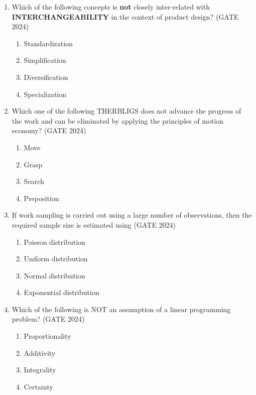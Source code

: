 \documentclass[journal,12pt,onecolumn]{IEEEtran}
\theoremstyle{remark}
\begin{document}
\begin{enumerate}
\item Which of the following concepts is \textbf{not} closely inter-related with \textbf{INTERCHANGEABILITY} in the context of product design?
\hfill{(GATE 2024)}
\begin{multicols}{4}
\begin{enumerate}
    \item Standardization
    \item Simplification
    \item Diversification
    \item Specialization
\end{enumerate}
\end{multicols}
\vspace{1cm}

\item Which one of the following THERBLIGS does not advance the progress of the work and can be eliminated by applying the principles of motion economy?
\hfill{(GATE 2024)}
\begin{multicols}{4}
\begin{enumerate}
    \item Move
    \item Grasp
    \item Search
    \item Preposition
\end{enumerate}
\end{multicols}
\vspace{1cm}

\item If work sampling is carried out using a large number of observations, then the required sample size is estimated using
\hfill{(GATE 2024)}
\begin{multicols}{4}
\begin{enumerate}
    \item Poisson distribution
    \item Uniform distribution
    \item Normal distribution
    \item Exponential distribution
\end{enumerate}
\end{multicols}
\vspace{1cm}

\item Which of the following is NOT an assumption of a linear programming problem?
\hfill{(GATE 2024)}
\begin{multicols}{4}
\begin{enumerate}
    \item Proportionality
    \item Additivity
    \item Integrality
    \item Certainty
\end{enumerate}
\end{multicols}
\vspace{1cm}


\end{enumerate}
\end{document}
